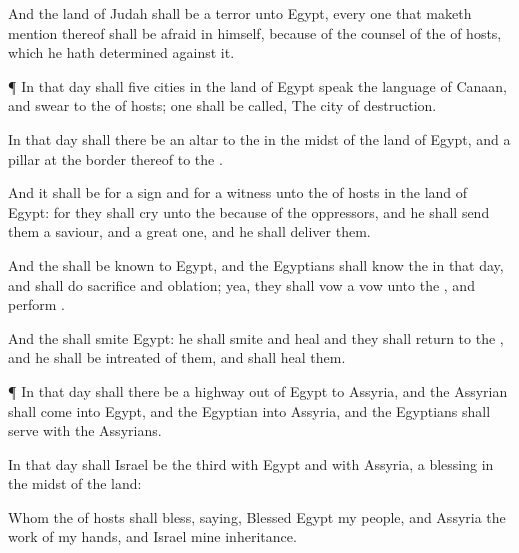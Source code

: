 {And the
land of
Judah shall be a
terror unto
Egypt, every one that maketh
mention thereof shall be
afraid in himself,
because of the
counsel of the
{} of
hosts, which he hath
determined against it.


\par }{\PP {}¶ In that
day shall
five
cities in the
land of
Egypt
speak the
language of
Canaan, and
swear to the
{} of
hosts;
one shall be
called, The
city of
destruction.

In that
day shall there be an
altar to the
{} in the
midst of the
land of
Egypt, and a
pillar
at the
border thereof to the
{}.

And it shall be for a
sign and for a
witness unto the
{} of
hosts in the
land of
Egypt: for they shall
cry unto the
{}
because of the
oppressors, and he shall
send them a
saviour, and a great
one, and he shall
deliver them.

And the
{} shall be
known to
Egypt, and the
Egyptians shall
know the
{} in that
day, and shall
do
sacrifice and
oblation; yea, they shall
vow a
vow unto the
{}, and
perform
{}.

And the
{} shall
smite
Egypt: he shall
smite and
heal
{} and they shall
return
{} to the
{}, and he shall be
intreated of them, and shall
heal them.


\par }{\PP {}¶ In that
day shall there be a
highway out of
Egypt to
Assyria, and the
Assyrian shall
come into
Egypt, and the
Egyptian into
Assyria, and the
Egyptians shall
serve with the
Assyrians.

In that
day shall
Israel be the
third with
Egypt and with
Assyria,
{} a
blessing in the
midst of the
land:

Whom the
{} of
hosts shall
bless,
saying,
Blessed
{}
Egypt my
people, and
Assyria the
work of my
hands, and
Israel mine
inheritance.




\par }
